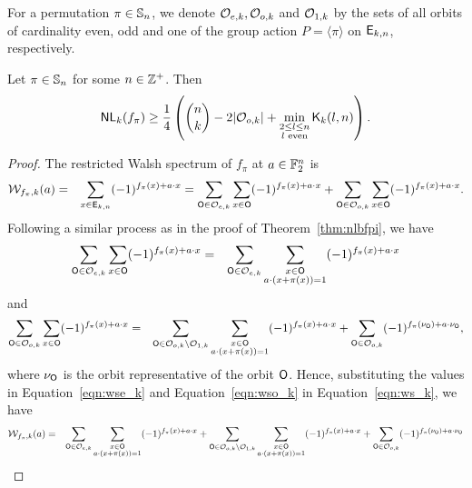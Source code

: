 \documentclass{llncs}
\begin{document}
For a permutation $\pi \in \mathbb{S}_n$, we denote $\mathcal{O}_{e,k}, \mathcal{O}_{o,k}$ and $\mathcal{O}_{1,k}$ by the sets of all orbits of cardinality even, odd and one of the group action $P = \langle \pi \rangle$ on $\mathsf{E}_{k,n}$, respectively.
\begin{theorem}\label{thm:NLkb}
Let $\pi \in \mathbb{S}_n$ for some $n \in \mathbb{Z}^+$.
Then $$\mathsf{NL}_{k}(f_\pi) \geq \frac{1}{4}\left({n \choose k} - 2|\mathcal{O}_{o,k}| + \min_{\substack{2 \leq l \leq n \\ l \text{ even}}} \mathsf{K}_{k}(l,n)\right).$$
\end{theorem}
\begin{proof}
The restricted Walsh spectrum of $f_\pi$ at $a \in \mathbb{F}_2^n$ is
\begin{eqnarray} \label{eqn:ws_k}
\mathcal{W}_{f_\pi,k}(a) & =  & \sum_{x \in \mathsf{E}_{k,n}} (-1)^{f_\pi (x)+a \cdot x} 
 = \sum_{\mathsf{O} \in \mathcal{O}_{e,k}} \sum_{x \in \mathsf{O}} (-1)^{ f_\pi (x) + a \cdot x} + \sum_{\mathsf{O} \in \mathcal{O}_{o,k}} \sum_{x \in \mathsf{O}} (-1)^{ f_\pi (x) + a \cdot x}.
\end{eqnarray}
Following a similar process as in the proof of Theorem~\ref{thm:nlbfpi}, we have
\begin{eqnarray}\label{eqn:wse_k}
\sum_{\mathsf{O} \in \mathcal{O}_{e,k}} \sum_{x \in \mathsf{O}} (-1)^{ f_\pi(x) + a \cdot x} 
& = & \sum_{\mathsf{O} \in \mathcal{O}_{e,k}} \sum_{\substack{x \in \mathsf{O} \\ a \cdot (x + \pi(x))= 1}} (-1)^{f_\pi(x)+ a \cdot x} 
\end{eqnarray}
and 
\begin{eqnarray}\label{eqn:wso_k}
\sum_{\mathsf{O} \in \mathcal{O}_{o,k}} \sum_{x \in \mathsf{O}} (-1)^{ f_\pi(x) + a \cdot x} 
& = & \sum_{\mathsf{O} \in \mathcal{O}_{o,k}\setminus \mathcal{O}_{1,k}} \sum_{\substack{x \in \mathsf{O} \\ a \cdot (x + \pi(x))= 1}} (-1)^{f_\pi(x)+ a \cdot x} + \sum_{\mathsf{O} \in \mathcal{O}_{o,k}} (-1)^{ f_\pi(\nu_{\mathsf{O}}) + a \cdot \nu_{\mathsf{O}}},
\end{eqnarray}
where $\nu_{\mathsf{O}}$ is the orbit representative of the orbit $\mathsf{O}$.
Hence, substituting the values in Equation~\ref{eqn:wse_k} and Equation~\ref{eqn:wso_k} in Equation~\ref{eqn:ws_k}, we have
\begin{eqnarray*}
\wtk{f_\pi}{k}(a) & =  & \sum_{\orb \in \orbs_{e,k}} \sum_{\substack{x \in \orb \\ a \cdot (x + \pi(x))= 1}} (-1)^{f_\pi(x)+ a \cdot x} + \sum_{\orb \in \orbs_{o,k}\setminus \orbs_{1,k}} \sum_{\substack{x \in \orb \\ a \cdot (x + \pi(x))= 1}} (-1)^{f_\pi(x)+ a \cdot x} + \sum_{\orb \in \orbs_{o,k}} (-1)^{ f_\pi(\nu_\orb) + a \cdot \nu_\orb} \nonumber \\

\end{eqnarray*}
\end{proof}
\end{document}
